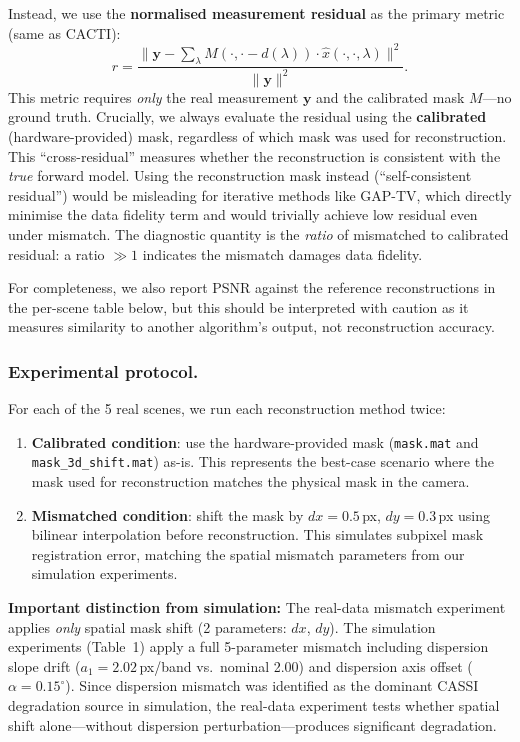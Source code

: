 \documentclass[runningheads]{llncs}
\begin{document}
Instead, we use the \textbf{normalised measurement residual} as the primary metric (same as CACTI):
\begin{equation}
    r = \frac{\|\mathbf{y} - \sum_{\lambda} M(\cdot, \cdot - d(\lambda)) \cdot \hat{x}(\cdot, \cdot, \lambda)\|^2}{\|\mathbf{y}\|^2}.
\end{equation}
This metric requires \emph{only} the real measurement $\mathbf{y}$ and the calibrated mask $M$---no ground truth.
Crucially, we always evaluate the residual using the \textbf{calibrated} (hardware-provided) mask, regardless of which mask was used for reconstruction.
This ``cross-residual'' measures whether the reconstruction is consistent with the \emph{true} forward model.
Using the reconstruction mask instead (``self-consistent residual'') would be misleading for iterative methods like GAP-TV, which directly minimise the data fidelity term and would trivially achieve low residual even under mismatch.
The diagnostic quantity is the \emph{ratio} of mismatched to calibrated residual: a ratio $\gg 1$ indicates the mismatch damages data fidelity.

For completeness, we also report PSNR against the reference reconstructions in the per-scene table below, but this should be interpreted with caution as it measures similarity to another algorithm's output, not reconstruction accuracy.

\subsubsection{Experimental protocol.}
For each of the 5 real scenes, we run each reconstruction method twice:
\begin{enumerate}
    \item \textbf{Calibrated condition}: use the hardware-provided mask (\texttt{mask.mat} and \texttt{mask\_3d\_shift.mat}) as-is. This represents the best-case scenario where the mask used for reconstruction matches the physical mask in the camera.
    \item \textbf{Mismatched condition}: shift the mask by $dx{=}0.5$\,px, $dy{=}0.3$\,px using bilinear interpolation before reconstruction. This simulates subpixel mask registration error, matching the spatial mismatch parameters from our simulation experiments.
\end{enumerate}

\textbf{Important distinction from simulation:} The real-data mismatch experiment applies \emph{only} spatial mask shift (2 parameters: $dx$, $dy$).
The simulation experiments (Table~1) apply a full 5-parameter mismatch including dispersion slope drift ($a_1{=}2.02$\,px/band vs.\ nominal 2.00) and dispersion axis offset ($\alpha{=}0.15^\circ$).
Since dispersion mismatch was identified as the dominant CASSI degradation source in simulation, the real-data experiment tests whether spatial shift alone---without dispersion perturbation---produces significant degradation.
\end{document}

